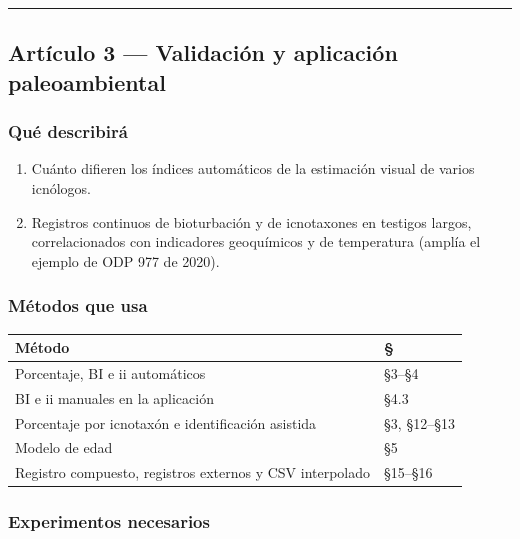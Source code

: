 \documentclass[
  10pt,
]{article}
\providecommand{\tightlist}{%
  \setlength{\itemsep}{0pt}\setlength{\parskip}{0pt}}
\begin{document}
\begin{center}\rule{0.5\linewidth}{0.5pt}\end{center}

\hypertarget{artuxedculo-3-validaciuxf3n-y-aplicaciuxf3n-paleoambiental}{%
\subsection{Artículo 3 --- Validación y aplicación
paleoambiental}\label{artuxedculo-3-validaciuxf3n-y-aplicaciuxf3n-paleoambiental}}

\hypertarget{quuxe9-describiruxe1-1}{%
\subsubsection{Qué describirá}\label{quuxe9-describiruxe1-1}}

\begin{enumerate}
\def\labelenumi{\arabic{enumi}.}
\tightlist
\item
  Cuánto difieren los índices automáticos de la estimación visual de
  varios icnólogos.
\item
  Registros continuos de bioturbación y de icnotaxones en testigos
  largos, correlacionados con indicadores geoquímicos y de temperatura
  (amplía el ejemplo de ODP 977 de 2020).
\end{enumerate}

\hypertarget{muxe9todos-que-usa-2}{%
\subsubsection{Métodos que usa}\label{muxe9todos-que-usa-2}}

\begin{longtable}[]{@{}ll@{}}
\toprule\noalign{}
Método & § \\
\midrule\noalign{}
\endhead
\bottomrule\noalign{}
\endlastfoot
Porcentaje, BI e ii automáticos & §3--§4 \\
BI e ii manuales en la aplicación & §4.3 \\
Porcentaje por icnotaxón e identificación asistida & §3, §12--§13 \\
Modelo de edad & §5 \\
Registro compuesto, registros externos y CSV interpolado & §15--§16 \\
\end{longtable}

\hypertarget{experimentos-necesarios-1}{%
\subsubsection{Experimentos
necesarios}\label{experimentos-necesarios-1}}
\end{document}
